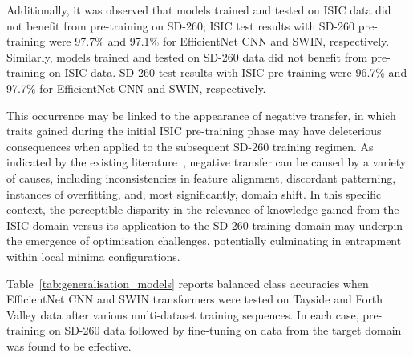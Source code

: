 Additionally, it was observed that models trained and tested on ISIC data did not benefit from pre-training on SD-260; ISIC test results with SD-260 pre-training were 97.7\% and 97.1\% for EfficientNet CNN and SWIN, respectively. Similarly, models trained and tested on SD-260 data did not benefit from pre-training on ISIC data. SD-260 test results with ISIC pre-training were 96.7\% and 97.7\% for EfficientNet CNN and SWIN, respectively.

This occurrence may be linked to the appearance of negative transfer, in which traits gained during the initial ISIC pre-training phase may have deleterious consequences when applied to the subsequent SD-260 training regimen. As indicated by the existing literature~\citep{wang2019characterizing}, negative transfer can be caused by a variety of causes, including inconsistencies in feature alignment, discordant patterning, instances of overfitting, and, most significantly, domain shift. In this specific context, the perceptible disparity in the relevance of knowledge gained from the ISIC domain versus its application to the SD-260 training domain may underpin the emergence of optimisation challenges, potentially culminating in entrapment within local minima configurations.

Table~\ref{tab:generalisation_models} reports balanced class accuracies when EfficientNet CNN and SWIN transformers were tested on Tayside and Forth Valley data after various multi-dataset training sequences. In each case, pre-training on SD-260 data followed by fine-tuning on data from the target domain was found to be effective.


